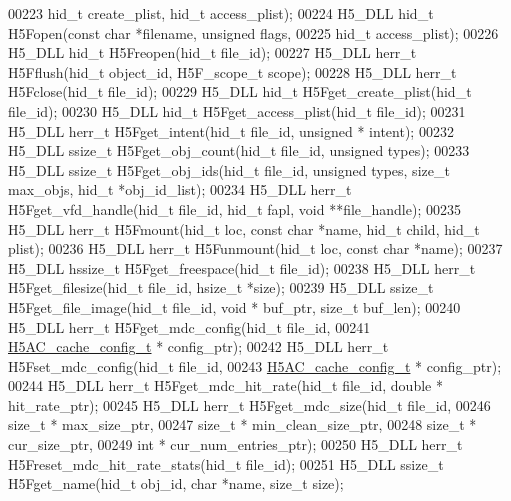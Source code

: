 \begin{DoxyCode}
00223               hid\_t create\_plist, hid\_t access\_plist);
00224 H5\_DLL hid\_t  H5Fopen(\textcolor{keyword}{const} \textcolor{keywordtype}{char} *filename, \textcolor{keywordtype}{unsigned} flags,
00225                 hid\_t access\_plist);
00226 H5\_DLL hid\_t  H5Freopen(hid\_t file\_id);
00227 H5\_DLL herr\_t H5Fflush(hid\_t object\_id, H5F\_scope\_t scope);
00228 H5\_DLL herr\_t H5Fclose(hid\_t file\_id);
00229 H5\_DLL hid\_t  H5Fget\_create\_plist(hid\_t file\_id);
00230 H5\_DLL hid\_t  H5Fget\_access\_plist(hid\_t file\_id);
00231 H5\_DLL herr\_t H5Fget\_intent(hid\_t file\_id, \textcolor{keywordtype}{unsigned} * intent);
00232 H5\_DLL ssize\_t H5Fget\_obj\_count(hid\_t file\_id, \textcolor{keywordtype}{unsigned} types);
00233 H5\_DLL ssize\_t H5Fget\_obj\_ids(hid\_t file\_id, \textcolor{keywordtype}{unsigned} types, \textcolor{keywordtype}{size\_t} max\_objs, hid\_t *obj\_id\_list);
00234 H5\_DLL herr\_t H5Fget\_vfd\_handle(hid\_t file\_id, hid\_t fapl, \textcolor{keywordtype}{void} **file\_handle);
00235 H5\_DLL herr\_t H5Fmount(hid\_t loc, \textcolor{keyword}{const} \textcolor{keywordtype}{char} *name, hid\_t child, hid\_t plist);
00236 H5\_DLL herr\_t H5Funmount(hid\_t loc, \textcolor{keyword}{const} \textcolor{keywordtype}{char} *name);
00237 H5\_DLL hssize\_t H5Fget\_freespace(hid\_t file\_id);
00238 H5\_DLL herr\_t H5Fget\_filesize(hid\_t file\_id, hsize\_t *size);
00239 H5\_DLL ssize\_t H5Fget\_file\_image(hid\_t file\_id, \textcolor{keywordtype}{void} * buf\_ptr, \textcolor{keywordtype}{size\_t} buf\_len);
00240 H5\_DLL herr\_t H5Fget\_mdc\_config(hid\_t file\_id,
00241                 \hyperlink{struct_h5_a_c__cache__config__t}{H5AC\_cache\_config\_t} * config\_ptr);
00242 H5\_DLL herr\_t H5Fset\_mdc\_config(hid\_t file\_id,
00243                 \hyperlink{struct_h5_a_c__cache__config__t}{H5AC\_cache\_config\_t} * config\_ptr);
00244 H5\_DLL herr\_t H5Fget\_mdc\_hit\_rate(hid\_t file\_id, \textcolor{keywordtype}{double} * hit\_rate\_ptr);
00245 H5\_DLL herr\_t H5Fget\_mdc\_size(hid\_t file\_id,
00246                               \textcolor{keywordtype}{size\_t} * max\_size\_ptr,
00247                               \textcolor{keywordtype}{size\_t} * min\_clean\_size\_ptr,
00248                               \textcolor{keywordtype}{size\_t} * cur\_size\_ptr,
00249                               \textcolor{keywordtype}{int} * cur\_num\_entries\_ptr);
00250 H5\_DLL herr\_t H5Freset\_mdc\_hit\_rate\_stats(hid\_t file\_id);
00251 H5\_DLL ssize\_t H5Fget\_name(hid\_t obj\_id, \textcolor{keywordtype}{char} *name, \textcolor{keywordtype}{size\_t} size);

\end{DoxyCode}
